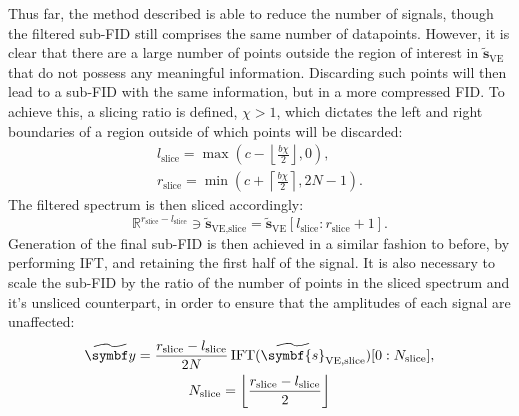 Thus far, the method described is able to reduce the number of signals,
though the filtered sub-\ac{FID} still comprises the same number of datapoints.
However, it is clear that there are a large number of points outside the region
of interest in $\widetilde{\symbf{s}}_{\text{VE}}$ that do not possess any
meaningful information. Discarding such points will then lead to a sub-\ac{FID}
with the same information, but in a more compressed \ac{FID}. To achieve this,
a slicing ratio is defined, $\chi > 1$, which dictates the
left and right boundaries of a region outside of which points will be discarded:
\begin{subequations}
    \begin{gather}
        l_{\text{slice}} = \max\left(
            c - \left \lfloor \frac{b \chi}{2} \right \rfloor, 0
            \right),\\
        r_{\text{slice}} = \min\left(
            c + \left \lceil \frac{b \chi}{2} \right \rceil, 2N - 1
            \right).
    \end{gather}
\end{subequations}
The filtered spectrum is then sliced accordingly:
\begin{equation}
    \mathbb{R}^{r_{\text{slice}} - l_{\text{slice}}} \ni
    \widetilde{\symbf{s}}_{\text{VE,slice}} =
    \widetilde{\symbf{s}}_{\text{VE}}[l_{\text{slice}} : r_{\text{slice}} + 1]
    .
\end{equation}
Generation of the final sub-\ac{FID} is then achieved in a similar fashion to
before, by performing \ac{IFT}, and retaining the first half of the signal.
It is also necessary to scale the sub-\ac{FID} by the ratio of the number of
points in the sliced spectrum and it's unsliced counterpart, in order to ensure
that the amplitudes of each signal are unaffected:
\begin{subequations}
    \begin{gather}
        \widetilde{\by} =
            \frac{r_{\text{slice}} - l_{\text{slice}}}{2N}
            \IFT(\widetilde{\symbf{s}}_{\text{VE,slice}})
            [0 : N_{\text{slice}}],\\
            N_{\text{slice}} = \left \lfloor \frac{r_{\text{slice}} - l_{\text{slice}}}{2} \right \rfloor
    \end{gather}
\end{subequations}
